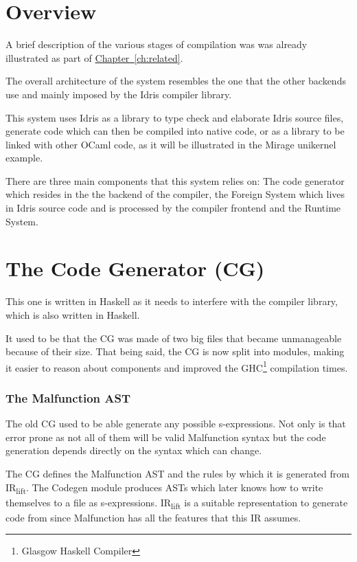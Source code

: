 
\section{Overview}
A brief description of the various stages of compilation was
was already illustrated as part of \hyperref[ch:related]{Chapter~\ref{ch:related}}.

The overall architecture of the system
resembles the one that the other backends use and mainly
imposed by the Idris compiler library.

This system uses Idris as
a library to type check and elaborate Idris source files,
generate code which can then be compiled into native code,
or as a library to be linked with other OCaml code, as
it will be illustrated in the Mirage unikernel example.

There are three main components that this system relies on:
The code generator which resides in the
the backend of the compiler, the Foreign System which
lives in Idris source code and is processed by the compiler
frontend and the Runtime System.

\section{The Code Generator (CG)}
This one is written in Haskell as it needs to interfere
with the compiler library, which is also written in Haskell.

It used to be that the CG was made of two big files that became
unmanageable because of their size.
That being said, the CG is now split into modules, making
it easier to reason about components and improved the
GHC\footnote{Glasgow Haskell Compiler} compilation times.

\subsubsection{The Malfunction AST}
The old CG used to be able generate any possible
s-expressions. Not only is that error prone as not all of them
will be valid Malfunction syntax but the code generation
depends directly on the syntax which can change.

The CG defines the Malfunction
AST and the rules by which it is generated
from
IR\textsubscript{lift}. The Codegen module produces ASTs
which later knows how to write themselves to a file as
s-expressions.
IR\textsubscript{lift} is a suitable representation to generate
code from since Malfunction has all the features that this
IR assumes.

